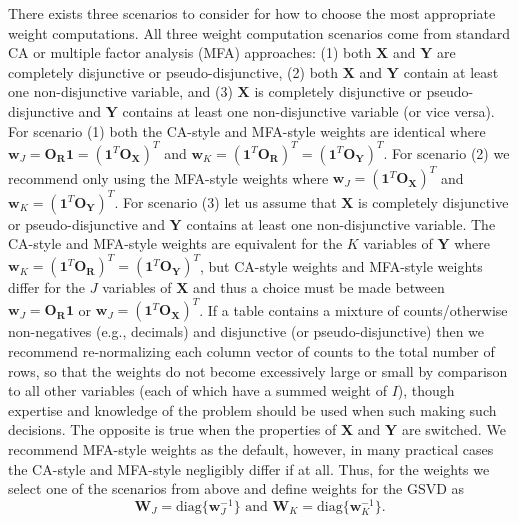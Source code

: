 \documentclass[12pt]{article}
\begin{document}
There exists three scenarios to consider for how to choose the most
appropriate weight computations. All three weight computation scenarios
come from standard CA or multiple factor analysis (MFA)
\citep{abdi_multiple_2013, escofier_multiple_1994} approaches: (1) both
\({\mathbf X}\) and \({\mathbf Y}\) are completely disjunctive or
pseudo-disjunctive, (2) both \({\mathbf X}\) and \({\mathbf Y}\) contain
at least one non-disjunctive variable, and (3) \({\mathbf X}\) is
completely disjunctive or pseudo-disjunctive and \({\mathbf Y}\)
contains at least one non-disjunctive variable (or vice versa). For
scenario (1) both the CA-style and MFA-style weights are identical where
\({\mathbf w}_{J} = {\mathbf O}_{\mathbf R}{\mathbf 1} = ({\mathbf 1}^{T}{\mathbf O}_{\mathbf X})^{T}\)
and
\({\mathbf w}_{K} = ({\mathbf 1}^{T}{\mathbf O}_{\mathbf R})^{T} = ({\mathbf 1}^{T}{\mathbf O}_{\mathbf Y})^{T}\).
For scenario (2) we recommend only using the MFA-style weights where
\({\mathbf w}_{J} = ({\mathbf 1}^{T}{\mathbf O}_{\mathbf X})^{T}\) and
\({\mathbf w}_{K} = ({\mathbf 1}^{T}{\mathbf O}_{\mathbf Y})^{T}\). For
scenario (3) let us assume that \({\mathbf X}\) is completely
disjunctive or pseudo-disjunctive and \({\mathbf Y}\) contains at least
one non-disjunctive variable. The CA-style and MFA-style weights are
equivalent for the \(K\) variables of \({\mathbf Y}\) where
\({\mathbf w}_{K} = ({\mathbf 1}^{T}{\mathbf O}_{\mathbf R})^{T} = ({\mathbf 1}^{T}{\mathbf O}_{\mathbf Y})^{T}\),
but CA-style weights and MFA-style weights differ for the \(J\)
variables of \({\mathbf X}\) and thus a choice must be made between
\({\mathbf w}_{J} = {\mathbf O}_{\mathbf R}{\mathbf 1}\) or
\({\mathbf w}_{J} = ({\mathbf 1}^{T}{\mathbf O}_{\mathbf X})^{T}\). If a
table contains a mixture of counts/otherwise non-negatives (e.g.,
decimals) and disjunctive (or pseudo-disjunctive) then we recommend
re-normalizing each column vector of counts to the total number of rows,
so that the weights do not become excessively large or small by
comparison to all other variables (each of which have a summed weight of
\(I\)), though expertise and knowledge of the problem should be used
when such making such decisions. The opposite is true when the
properties of \({\mathbf X}\) and \({\mathbf Y}\) are switched. We
recommend MFA-style weights as the default, however, in many practical
cases the CA-style and MFA-style negligibly differ if at all. Thus, for
the weights we select one of the scenarios from above and define weights
for the GSVD as \begin{equation}
{\mathbf W}_{J} =  \mathrm{diag\{} {\mathbf w}_{J}^{-1} \mathrm{\}} \text{ and } {\mathbf W}_{K} = \mathrm{diag\{} {\mathbf w}_{K}^{-1} \mathrm{\}}.
\label{eq:genweights}
\end{equation}
\end{document}
